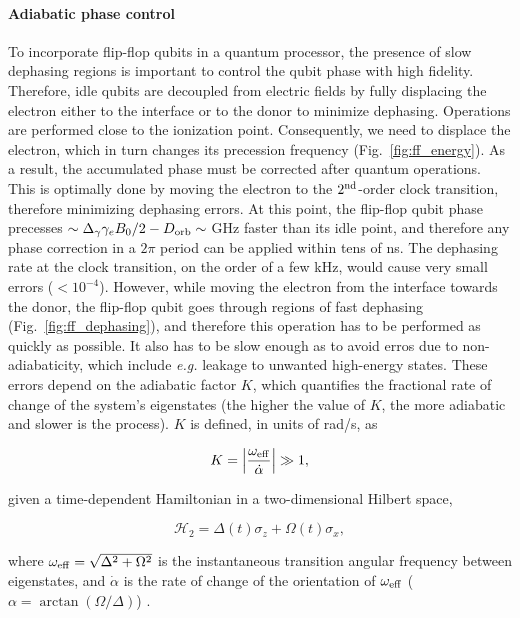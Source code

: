 \paragraph{Adiabatic phase control}

To incorporate flip-flop qubits in a quantum processor, the presence of slow dephasing regions is important to control the qubit phase with high fidelity. Therefore, idle qubits are decoupled from electric fields by fully displacing the electron either to the interface or to the donor to minimize dephasing. Operations are performed close to the ionization point. 
Consequently, we need to displace the electron, which in turn changes its precession frequency (Fig.~\ref{fig:ff_energy}). As a result, the accumulated phase must be corrected after quantum operations. This is optimally done by moving the electron to the $2^{\rm nd}$-order clock transition, therefore minimizing dephasing errors. At this point, the flip-flop qubit phase precesses $\sim\Delta_\gamma\gamma_e B_0/2-D_{\rm orb}\sim\ $GHz faster than its idle point, and therefore any phase correction in a $2\pi$ period can be applied within tens of ns. The dephasing rate at the clock transition, on the order of a few kHz, would cause very small errors ($<10^{-4}$). However, while moving the electron from the interface towards the donor, the flip-flop qubit goes through regions of fast dephasing (Fig.~\ref{fig:ff_dephasing}), and therefore this operation has to be performed as quickly as possible. It also has to be slow enough as to avoid erros due to non-adiabaticity, which include \textit{e.g.} leakage to unwanted high-energy states. These errors depend on the adiabatic factor $K$, which quantifies the fractional rate of change of the system's eigenstates (the higher the value of $K$, the more adiabatic and slower is the process). $K$ is defined, in units of rad/s, as

\begin{equation} \label{eq:K_def}
K=\left|\frac{\omega_{\rm eff}}{\dot{\alpha}}\right|\gg1,
\end{equation}

given a time-dependent Hamiltonian in a two-dimensional Hilbert space, 

 \begin{equation}
\mathcal{H}_2=\Delta(t)\sigma_z+\Omega(t)\sigma_x,
\end{equation}

where $\omega_{\rm eff}=\sqrt{\Delta^2+\Omega^2}$ is the instantaneous transition angular frequency between eigenstates, and $\dot{\alpha}$ is the rate of change of the orientation of $\omega_{\rm eff}$ ($\alpha=\arctan{(\Omega/\Delta)}$) \cite{Garwood2001}. 

